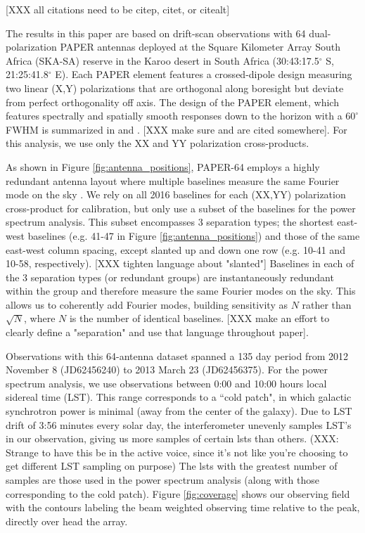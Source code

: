 \documentclass[twocolumn,numberedappendix]{emulateapj} \shorttitle{PSA64}
\begin{document}
[XXX all citations need to be citep, citet, or citealt]

The results in this paper are based on drift-scan observations 
with 64 dual-polarization PAPER antennas deployed 
at the Square Kilometer Array South Africa
(SKA-SA) reserve in the Karoo desert in South Africa
(30:43:17.5$^\circ$ S, 21:25:41.8$^\circ$ E).
Each PAPER element features a crossed-dipole design measuring two
linear (X,Y) polarizations that are orthogonal along boresight but deviate
from perfect orthogonality off axis.  The design of the PAPER element, 
which features spectrally and spatially smooth responses 
down to the horizon with a $60^{\circ}$ FWHM is summarized in \citet{parsons_et_al2010}
and \citet{pober_et_al2012}.  
[XXX make sure \cite{jacobs_et_al2011} and \cite{stefan_et_al2013} are cited somewhere].
For this analysis, we use only the XX and YY polarization cross-products.

As shown in Figure \ref{fig:antenna_positions}, PAPER-64 employs
a highly redundant antenna layout where multiple baselines measure
the same Fourier mode on the sky
\citep{parsons_et_al2012a,parsons_et_al2014}.
We rely on all 2016 baselines for each (XX,YY) polarization cross-product for calibration,
but only use a subset of the baselines for the power spectrum
analysis. This subset encompasses 3 separation types; the shortest 
east-west baselines (e.g. 41-47 in Figure \ref{fig:antenna_positions}) and those of the same east-west column spacing,
except slanted up and down one row (e.g. 10-41 and 10-58, respectively).
[XXX tighten language about "slanted"]
Baselines in each of the 3 separation types (or redundant groups) are
instantaneously redundant within the group and therefore measure the same
Fourier modes on the sky. This allows us to coherently add Fourier modes,
building sensitivity as $N$ rather than $\sqrt{N}$, where $N$ is the number of identical baselines.
[XXX make an effort to clearly define a "separation" and use that language throughout paper].

Observations with this 64-antenna dataset spanned a 135 day period 
from 2012 November 8 (JD62456240) to 2013 March 23 (JD62456375). 
For the power spectrum analysis, we use observations between 0:00 and 10:00 hours
local sidereal time (LST). This range corresponds to
a ``cold patch", in which galactic synchrotron power is minimal (away from
the center of the galaxy). Due to LST drift of 3:56 minutes every solar day, the interferometer
unevenly samples LST's in our observation, giving us more samples of certain
lsts than others. (XXX: Strange to have this be in the active voice, since 
it's not like you're choosing to get different LST sampling on purpose)
The lsts with the greatest number of samples are those used in
the power spectrum analysis (along with those corresponding to the cold patch).
Figure \ref{fig:coverage} shows our observing field with the contours labeling
the beam weighted observing time relative to the peak, directly over head the
array.
\end{document}
